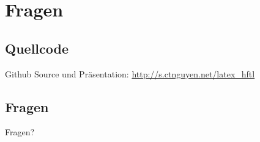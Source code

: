 \documentclass[xcolor=x11names,compress]{beamer} %
\renewcommand{\(}{\begin{columns}}
\renewcommand{\)}{\end{columns}}
\newcommand{\<}[1]{\begin{column}{#1}}
\renewcommand{\>}{\end{column}}
\begin{document}
\section{Fragen}
	\subsection{Quellcode}
		\begin{frame}
			Github Source und Präsentation:
			\href{http://s.ctnguyen.net/latex_hftl}{http://s.ctnguyen.net/latex\_hftl}
		\end{frame}

	\subsection{Fragen}
		\begin{frame}
			\huge{Fragen?}
		\end{frame}
\end{document}

